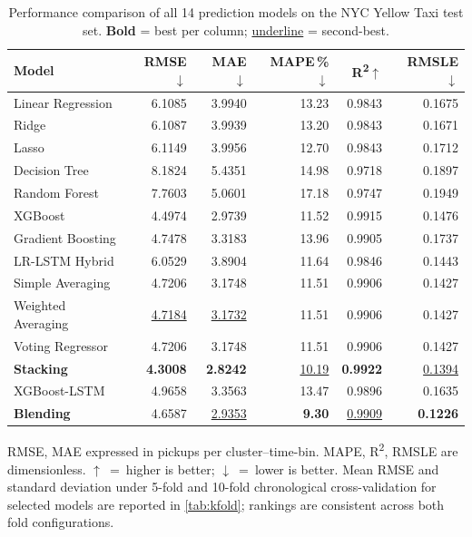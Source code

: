 \begin{table}[t]
\centering
\caption{Performance comparison of all 14 prediction models on the NYC Yellow Taxi test set. \textbf{Bold} = best per column; \underline{underline} = second-best.\label{tab:results_full}}
\begin{threeparttable}
\begin{tabular*}{\textwidth}{@{\extracolsep\fill}lrrrrr@{}}
\toprule
\textbf{Model} & \textbf{RMSE}$\downarrow$ & \textbf{MAE}$\downarrow$ & \textbf{MAPE\,\%}$\downarrow$ & \textbf{R\textsuperscript{2}}$\uparrow$ & \textbf{RMSLE}$\downarrow$ \\
\midrule
Linear Regression & 6.1085 & 3.9940 & 13.23 & 0.9843 & 0.1675 \\
Ridge & 6.1087 & 3.9939 & 13.20 & 0.9843 & 0.1671 \\
Lasso & 6.1149 & 3.9956 & 12.70 & 0.9843 & 0.1712 \\
Decision Tree & 8.1824 & 5.4351 & 14.98 & 0.9718 & 0.1897 \\
Random Forest & 7.7603 & 5.0601 & 17.18 & 0.9747 & 0.1949 \\
XGBoost & 4.4974 & 2.9739 & 11.52 & 0.9915 & 0.1476 \\
Gradient Boosting & 4.7478 & 3.3183 & 13.96 & 0.9905 & 0.1737 \\
LR-LSTM Hybrid & 6.0529 & 3.8904 & 11.64 & 0.9846 & 0.1443 \\
Simple Averaging & 4.7206 & 3.1748 & 11.51 & 0.9906 & 0.1427 \\
Weighted Averaging & \underline{4.7184} & \underline{3.1732} & 11.51 & 0.9906 & 0.1427 \\
Voting Regressor & 4.7206 & 3.1748 & 11.51 & 0.9906 & 0.1427 \\
\textbf{Stacking} & \textbf{4.3008} & \textbf{2.8242} & \underline{10.19} & \textbf{0.9922} & \underline{0.1394} \\
XGBoost-LSTM & 4.9658 & 3.3563 & 13.47 & 0.9896 & 0.1635 \\
\textbf{Blending} & 4.6587 & \underline{2.9353} & \textbf{9.30} & \underline{0.9909} & \textbf{0.1226} \\
\bottomrule
\end{tabular*}
\begin{tablenotes}
 \small
 \item RMSE, MAE expressed in pickups per cluster--time-bin. MAPE, R\textsuperscript{2}, RMSLE are dimensionless. $\uparrow$~=~higher is better; $\downarrow$~=~lower is better. Mean RMSE and standard deviation under 5-fold and 10-fold chronological cross-validation for selected models are reported in \autoref{tab:kfold}; rankings are consistent across both fold configurations.
\end{tablenotes}
\end{threeparttable}
\end{table}

